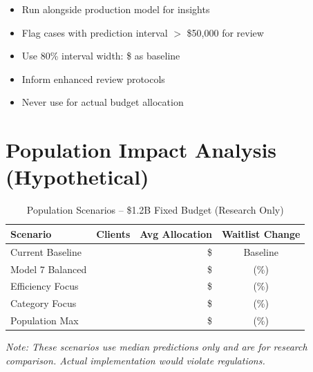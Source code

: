 \begin{itemize}
    \item Run alongside production model for insights
    \item Flag cases with prediction interval $>$ \$50,000 for review
    \item Use 80\% interval width: \$\ModelSevenPredictionIntervalWidth{} as baseline
    \item Inform enhanced review protocols
    \item Never use for actual budget allocation
\end{itemize}

\section{Population Impact Analysis (Hypothetical)}

\begin{table}[h]
\centering
\caption{Population Scenarios -- \$1.2B Fixed Budget (Research Only)}
\begin{tabular}{lrrc}
\toprule
\textbf{Scenario} & \textbf{Clients} & \textbf{Avg Allocation} & \textbf{Waitlist Change} \\
\midrule
Current Baseline & \ModelSevenPopcurrentbaselineClients{} & \$\ModelSevenPopcurrentbaselineAvgAlloc{} & Baseline \\
Model 7 Balanced & \ModelSevenPopmodelbalancedClients{} & \$\ModelSevenPopmodelbalancedAvgAlloc{} & \ModelSevenPopmodelbalancedWaitlistChange{} (\ModelSevenPopmodelbalancedWaitlistPct{}\%) \\
Efficiency Focus & \ModelSevenPopmodelefficiencyClients{} & \$\ModelSevenPopmodelefficiencyAvgAlloc{} & \ModelSevenPopmodelefficiencyWaitlistChange{} (\ModelSevenPopmodelefficiencyWaitlistPct{}\%) \\
Category Focus & \ModelSevenPopcategoryfocusedClients{} & \$\ModelSevenPopcategoryfocusedAvgAlloc{} & \ModelSevenPopcategoryfocusedWaitlistChange{} (\ModelSevenPopcategoryfocusedWaitlistPct{}\%) \\
Population Max & \ModelSevenPoppopulationmaximizedClients{} & \$\ModelSevenPoppopulationmaximizedAvgAlloc{} & \ModelSevenPoppopulationmaximizedWaitlistChange{} (\ModelSevenPoppopulationmaximizedWaitlistPct{}\%) \\
\bottomrule
\end{tabular}
\end{table}

\textit{Note: These scenarios use median predictions only and are for research comparison. Actual implementation would violate regulations.}

